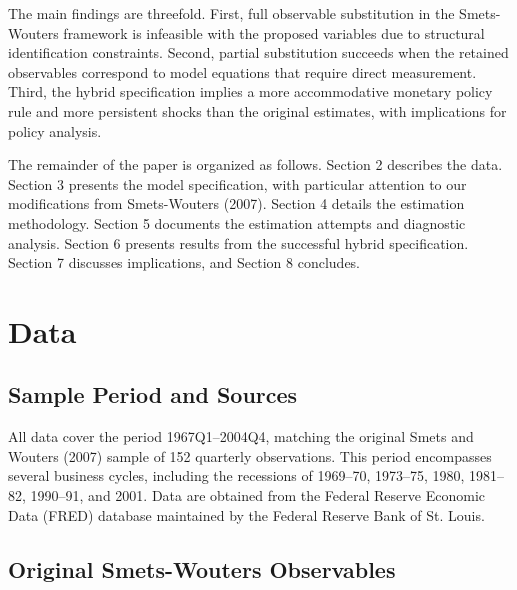 \documentclass[12pt]{article}
\begin{document}
The main findings are threefold. First, full observable substitution in the Smets-Wouters framework is infeasible with the proposed variables due to structural identification constraints. Second, partial substitution succeeds when the retained observables correspond to model equations that require direct measurement. Third, the hybrid specification implies a more accommodative monetary policy rule and more persistent shocks than the original estimates, with implications for policy analysis.

The remainder of the paper is organized as follows. Section 2 describes the data. Section 3 presents the model specification, with particular attention to our modifications from Smets-Wouters (2007). Section 4 details the estimation methodology. Section 5 documents the estimation attempts and diagnostic analysis. Section 6 presents results from the successful hybrid specification. Section 7 discusses implications, and Section 8 concludes.

\section{Data}

\subsection{Sample Period and Sources}

All data cover the period 1967Q1--2004Q4, matching the original Smets and Wouters (2007) sample of 152 quarterly observations. This period encompasses several business cycles, including the recessions of 1969--70, 1973--75, 1980, 1981--82, 1990--91, and 2001. Data are obtained from the Federal Reserve Economic Data (FRED) database maintained by the Federal Reserve Bank of St. Louis.

\subsection{Original Smets-Wouters Observables}
\end{document}
